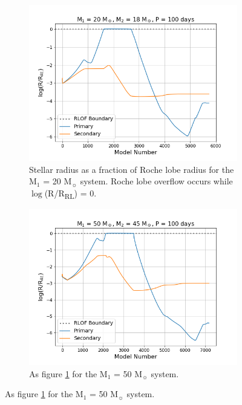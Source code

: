 \begin{figure}
    \begin{subfigure}{\columnwidth}
        \includegraphics[width=\columnwidth]{figures/results1/fig_RLOF_M20_P100.png}
        \captionsetup{width=.9\columnwidth}
        \caption{Stellar radius as a fraction of Roche lobe radius for the M$_1$ = 20 M$_{\sun}$ system. Roche lobe overflow occurs while $\log$(R/R\textsubscript{RL}) = 0.}
        \label{subfig:20Msol_RLOF}
    \end{subfigure}
    \hfill
    \begin{subfigure}{\columnwidth}
        \includegraphics[width=\columnwidth]{figures/results1/fig_RLOF_M50_P100.png}
        \captionsetup{width=.9\columnwidth}
        \caption{As figure \ref{subfig:20Msol_RLOF} for the M$_1$ = 50 M$_{\sun}$ system. \newline}

\end{subfigure}
\end{figure}
